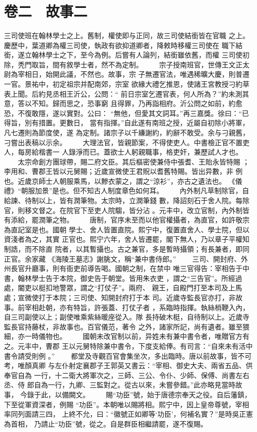 \documentclass{ctexart}
\begin{document}
\section{卷二　故事二}
\paragraph{}
三司使班在翰林學士之上。舊制，權使即与正同，故三司使結銜皆在官職 之上。慶歷中，葉道卿為權三司使，執政有欲抑道卿者，降敕時移權三司使在 職下結銜，遂立翰林學士之下，至今為例。后嘗有人論列，結銜雖依舊，而權 三司使初除，秃門取旨，間有敘學士者，然不為定制。 　　宗子授南班官，世傳王文正太尉為宰相日，始開此議，不然也。故事，宗 子無遷官法，唯遇稀曠大慶，則普遷一官。景祐中，初定祖宗并配南郊，宗室 欲緣大禮乞推恩，使諸王宮教授刁約草表上聞。后約見丞相王沂公，公問：`` 前日宗室乞遷官表，何人所為？''約未測其意，答以不知。歸而思之，恐事窮 且得罪，乃再詣相府。沂公問之如前，約愈恐，不復敢隱，遂以實對。公曰： ``無他，但愛其文詞耳。''再三嘉獎。徐曰：``已得旨，別有措置。更數日， 當有指揮。''自此遂有南班之授，近屬自初除小將軍，凡七遷則為節度使，遂 為定制。諸宗子以千縑謝約，約辭不敢受。余与刁親舊，刁嘗出表稿以示余。 　　大理法官，皆親節案，不得使吏人。中書檢正官不置吏人，每房給楷書一 人錄淨而已。蓋欲士人躬親職事，格吏奸，兼歷試人才也。 　　太宗命創方團球帶，賜二府文臣。其后樞密使兼侍中張耆、王貽永皆特賜 ；李用和、曹郡王皆以元舅賜；近歲宣微使王君貺以耆舊特賜。皆出异數，非 例也。近歲京師士人朝服乘馬，以黲衣蒙之，謂之``涼衫''，亦古之遺法也。 《儀禮》``朝服加景''是也。但不知古人制度章色如何耳。 　　內外制凡草制除官，自給諫、待制以上，皆有潤筆物。太宗時，立潤筆錢 數，降詔刻石于舍人院。每除官，則移文督之。在院官下至吏人院騶，皆分沾 。元丰中，改立官制，內外制皆有添給，罷潤筆之物。 　　唐制，官序未至而以他官權攝者，為直官，如許敬宗為直記室是也。國朝 學士、舍人皆置直院。熙宁中，復置直舍人、學士院，但以資淺者為之，其實 正官也。熙宁六年，舍人皆遷罷，閣下無人，乃以章子平權知制誥，而不除直 院者，以其暫攝也。古之兼官，多是暫時攝領；有長兼者，即同正官。余家藏 《海陵王墓志》謝朓文，稱``兼中書侍郎。'' 　　三司、開封府、外州長官升廳事，則有衙吏前導告喝。國朝之制，在禁中 唯三官得告：宰相告于中書，翰林學士告于本院，御史告于朝堂。皆用朱衣吏 ，謂之``三告官''。所經過處，閽吏以梃扣地警眾，謂之``打仗子''。兩府、 親王，自殿門打至本司及上馬處；宣微使打于本院；三司使、知開封府打于本 司。近歲寺監長官亦打，非故事。前宰相赴朝，亦有特旨，許張蓋、打仗子者 ，系臨時指揮。執絲梢鞭入內，自三司副使以上；副使唯乘紫絲暖座從入。隊 長持破木梃，自待制以上。近歲寺監長官持藤杖，非故事也。百官儀范，著令 之外，諸家所記，尚有遺者。雖至猥細，亦一時儀物也。 　　國朝未改官制以前，异姓未有兼中書令者，唯贈官方有之。元丰中，曹郡 王以元舅特除兼中書令，下度支給俸。有司言：``自來未有活中書令請受則例 。'' 　　都堂及寺觀百官會集坐次，多出臨時。唐以前故事，皆不可考，唯顏真卿 与左仆射定襄郡子王郭英又書云：``宰相、御史大夫、兩省五品、供奉官自為 一行，十二衛大將軍次之，三師、三公、令仆、少師、保傅、尚書左右丞、侍 郎自為一行，九卿、三監對之。從古以來，未嘗參錯。''此亦略見當時故事， 今錄于此，以備闕文。 　　賜``功臣''號，始于唐德宗奉天之役。自后藩鎮，下至從軍資深者，例賜 ``功臣''。本朝唯以賜將相。熙宁中，因上皇帝尊號，宰相率同列面請三四， 上終不允，曰：``徽號正如卿等`功臣'，何補名實？''是時吳正憲為首相， 乃請止``功臣''號，從之。自是群臣相繼請罷，遂不復賜。
\clearpage
\end{document}

